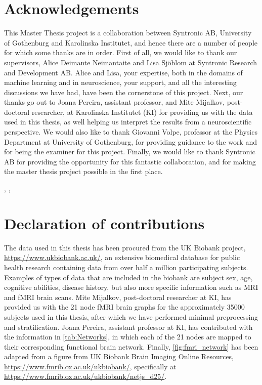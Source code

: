 \thispagestyle{plain}			%
\section*{Acknowledgements}
This Master Thesis project is a collaboration between Syntronic AB, University of Gothenburg and Karolinska Institutet, and hence there are a number of people for which some thanks are in order. First of all, we would like to thank our supervisors, Alice Deimante Neimantaite and Lisa Sjöblom at Syntronic Research and Development AB. Alice and Lisa, your expertise, both in the domains of machine learning and in neuroscience, your support, and all the interesting discussions we have had, have been the cornerstone of this project. Next, our thanks go out to Joana Pereira, assistant professor, and Mite Mijalkov, post-doctoral researcher, at Karolinska Institutet (KI) for providing us with the data used in this thesis, as well helping us interpret the results from a neuroscientific perspective. We would also like to thank Giovanni Volpe, professor at the Physics Department at University of Gothenburg, for providing guidance to the work and for being the examiner for this project. Finally, we would like to thank Syntronic AB for providing the opportunity for this fantastic collaboration, and for making the master thesis project possible in the first place.


\hfill
\thesisAuthor, \thesisCity, \thesisMonth\ \thesisYear
\vspace{0.5cm}
\section*{Declaration of contributions}
The data used in this thesis has been procured from the UK Biobank project, \url{https://www.ukbiobank.ac.uk/}, an extensive biomedical database for public health research containing data from over half a million participating subjects. Examples of types of data that are included in the biobank are subject sex, age, cognitive abilities, disease history, but also more specific information such as MRI and fMRI brain scans. Mite Mijalkov, post-doctoral researcher at KI, has provided us with the 21 node fMRI brain graphs for the approximately 35000 subjects used in this thesis, after which we have performed minimal preprocessing and stratification. Joana Pereira, assistant professor at KI, has contributed with the information in \cref{tab:Networks}, in which each of the 21 nodes are mapped to their corresponding functional brain network. Finally, \cref{fig:fmri_network} has been adapted from a figure from UK Biobank Brain Imaging Online Resources, \url{https://www.fmrib.ox.ac.uk/ukbiobank/}, specifically at \url{https://www.fmrib.ox.ac.uk/ukbiobank/netjs_d25/}. 

\if{}
\newpage				%
\thispagestyle{empty}
\mbox{}
\fi
